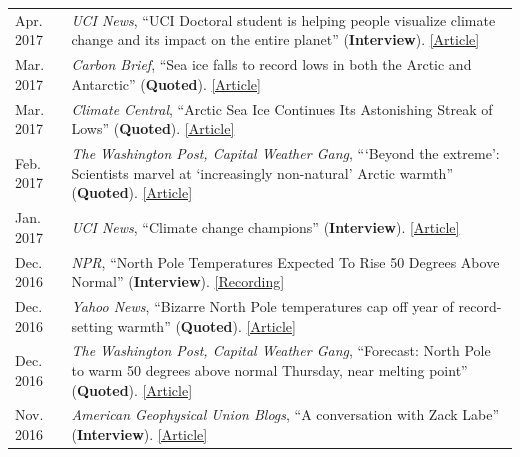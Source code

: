 \documentclass[margin,line,palatino,courier,10pt]{res}
\begin{document}
\begin{resume}
\begin{tabular}{@{}p{0.9in}p{4in}}
Apr. 2017 & \textit{UCI News}, ``UCI Doctoral student is helping people visualize climate change and its impact on the entire planet'' (\textbf{Interview}). \href{http://grad.uci.edu/news-and-events/student-spotlights/Zachary-Labe.html}{[Article]}\\
Mar. 2017 & \textit{Carbon Brief}, ``Sea ice falls to record lows in both the Arctic and Antarctic'' (\textbf{Quoted}). \href{https://www.carbonbrief.org/sea-ice-falls-record-lows-arctic-antarctic}{[Article]}\\
Mar. 2017 & \textit{Climate Central}, ``Arctic Sea Ice Continues Its Astonishing Streak of Lows'' (\textbf{Quoted}). \href{http://www.climatecentral.org/news/arctic-sea-ice-record-low-streak-21227}{[Article]}\\
Feb. 2017 & \textit{The Washington Post, Capital Weather Gang}, ```Beyond the extreme': Scientists marvel at `increasingly non-natural' Arctic warmth'' (\textbf{Quoted}). \href{https://www.washingtonpost.com/news/capital-weather-gang/wp/2017/02/01/beyond-the-extreme-scientists-marvel-at-increasingly-non-natural-arctic-warmth/?sdfsdfsdfsdfsd&utm_term=.cf3cf81d24f3}{[Article]}\\
Jan. 2017 & \textit{UCI News}, ``Climate change champions'' (\textbf{Interview}). \href{https://news.uci.edu/climate-change-champions/}{[Article]}\\
Dec. 2016 & \textit{NPR}, ``North Pole Temperatures Expected To Rise 50 Degrees Above Normal'' (\textbf{Interview}). \href{http://www.npr.org/2016/12/21/506483966/north-pole-temperatures-expected-to-rise-50-degrees-above-normal}{[Recording]}\\
Dec. 2016 & \textit{Yahoo News}, ``Bizarre North Pole temperatures cap off year of record-setting warmth'' (\textbf{Quoted}). \href{https://www.yahoo.com/news/bizarre-north-pole-temperatures-cap-off-year-of-record-setting-warmth-181727978.html?soc_src=social-sh&soc_trk=tw}{[Article]}\\
Dec. 2016 & \textit{The Washington Post, Capital Weather Gang}, ``Forecast: North Pole to warm 50 degrees above normal Thursday, near melting point'' (\textbf{Quoted}). \href{https://www.washingtonpost.com/news/capital-weather-gang/wp/2016/12/20/forecast-north-pole-to-warm-50-degrees-above-normal-thursday-near-melting-point/?dfgdfgdfgdfg&utm_term=.e648369ada7e}{[Article]}\\
Nov. 2016 & \textit{American Geophysical Union Blogs}, ``A conversation with Zack Labe'' (\textbf{Interview}). \href{http://blogs.agu.org/mountainbeltway/2016/11/23/conversation-zack-labe/}{[Article]}\\

\end{tabular}
\end{resume}
\end{document}
